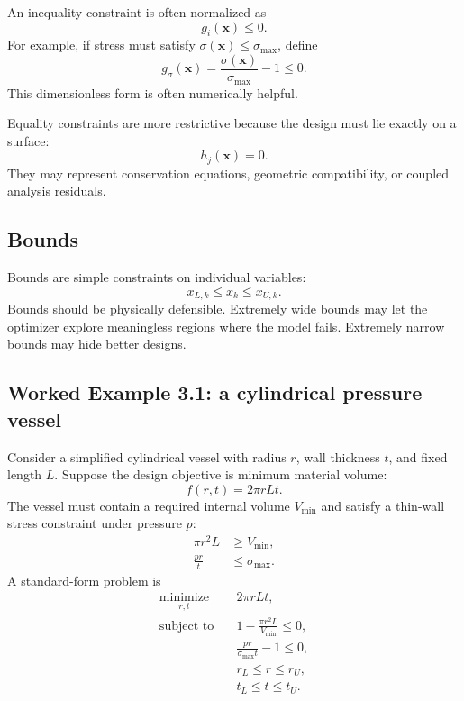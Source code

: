 \documentclass[11pt]{article}
\newcommand{\vect}[1]{\boldsymbol{#1}}
\newcommand{\des}{\vect{x}}
\begin{document}
An inequality constraint is often normalized as
\begin{equation}
g_i(\des) \leq 0.
\end{equation}
For example, if stress must satisfy $\sigma(\des) \leq \sigma_{\max}$, define
\begin{equation}
g_{\sigma}(\des)=\frac{\sigma(\des)}{\sigma_{\max}}-1 \leq 0.
\end{equation}
This dimensionless form is often numerically helpful.

Equality constraints are more restrictive because the design must lie exactly on a surface:
\begin{equation}
h_j(\des)=0.
\end{equation}
They may represent conservation equations, geometric compatibility, or coupled analysis residuals.

\subsection{Bounds}

Bounds are simple constraints on individual variables:
\begin{equation}
x_{L,k} \leq x_k \leq x_{U,k}.
\end{equation}
Bounds should be physically defensible. Extremely wide bounds may let the optimizer explore meaningless regions where the model fails. Extremely narrow bounds may hide better designs.

\subsection{Worked Example 3.1: a cylindrical pressure vessel}

Consider a simplified cylindrical vessel with radius $r$, wall thickness $t$, and fixed length $L$. Suppose the design objective is minimum material volume:
\begin{equation}
f(r,t)=2\pi rLt.
\end{equation}
The vessel must contain a required internal volume $V_{\min}$ and satisfy a thin-wall stress constraint under pressure $p$:
\begin{align}
\pi r^2 L &\geq V_{\min}, \\
\frac{pr}{t} &\leq \sigma_{\max}.
\end{align}
A standard-form problem is
\begin{align}
\underset{r,t}{\text{minimize}} \quad & 2\pi rLt, \\
\text{subject to} \quad & 1-\frac{\pi r^2L}{V_{\min}} \leq 0, \\
& \frac{pr}{\sigma_{\max}t}-1 \leq 0, \\
& r_L \leq r \leq r_U, \\
& t_L \leq t \leq t_U.
\end{align}
\end{document}
